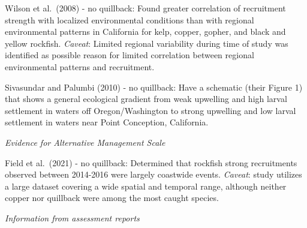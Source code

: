 \documentclass[11pt,
  english,
  letterpaper,
]{article}
\begin{document}

Wilson et al.~{(2008)\leavevmode\tagmcend\tagstructend} - no quillback: Found greater correlation of recruitment strength with localized environmental conditions than with regional environmental patterns in California for kelp, copper, gopher, and black and yellow rockfish. \emph{Caveat}: Limited regional variability during time of study was identified as possible reason for limited correlation between regional environmental patterns and recruitment.

\leavevmode\tagmcend\tagstructend\par


Sivasundar and Palumbi {(2010)\leavevmode\tagmcend\tagstructend} - no quillback: Have a schematic (their Figure 1) that shows a general ecological gradient from weak upwelling and high larval settlement in waters off Oregon/Washington to strong upwelling and low larval settlement in waters near Point Conception, California.

\leavevmode\tagmcend\tagstructend\par


\emph{Evidence for Alternative Management Scale}

\leavevmode\tagmcend\tagstructend\par


Field et al.~{(2021)\leavevmode\tagmcend\tagstructend} - no quillback: Determined that rockfish strong recruitments observed between 2014-2016 were largely coastwide events. \emph{Caveat}: study utilizes a large dataset covering a wide spatial and temporal range, although neither copper nor quillback were among the most caught species.

\leavevmode\tagmcend\tagstructend\par


\emph{Information from assessment reports}

\leavevmode\tagmcend\tagstructend\par

\end{document}
